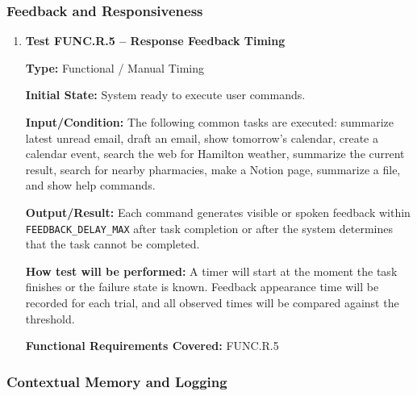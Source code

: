 \documentclass[12pt, titlepage]{article}
\begin{document}
\subsubsection{Feedback and Responsiveness}

\begin{enumerate}

\item \textbf{Test FUNC.R.5 -- Response Feedback Timing}

\textbf{Type:} Functional / Manual Timing

\textbf{Initial State:} System ready to execute user commands.

\textbf{Input/Condition:} The following common tasks are executed:
summarize latest unread email, draft an email, show tomorrow's calendar,
create a calendar event, search the web for Hamilton weather, summarize
the current result, search for nearby pharmacies, make a Notion page,
summarize a file, and show help commands.

\textbf{Output/Result:} Each command generates visible or spoken
feedback within \texttt{FEEDBACK\_DELAY\_MAX} after task completion or
after the system determines that the task cannot be completed.

\textbf{How test will be performed:} A timer will start at the moment the
task finishes or the failure state is known. Feedback appearance time
will be recorded for each trial, and all observed times will be compared
against the threshold.

\textbf{Functional Requirements Covered:} FUNC.R.5

\end{enumerate}

\subsubsection{Contextual Memory and Logging}
\end{document}
